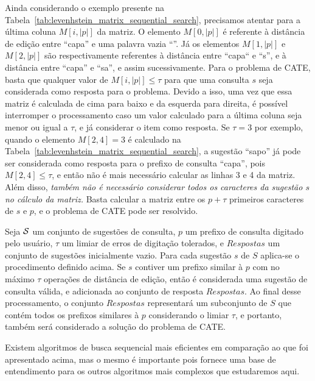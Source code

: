 Ainda considerando o exemplo presente na Tabela~\ref{tab:levenhstein_matrix_sequential_search}, precisamos atentar para a última coluna $M[i, |p|]$ da matriz. O elemento $M[0, |p|]$ é referente à distância de edição entre ``capa'' e uma palavra vazia ``''. Já os elementos $M[1, |p|]$ e $M[2, |p|]$ são respectivamente referentes à distância entre ``capa`` e ``s'', e à distância entre ``capa'' e ``sa'', e assim sucessivamente. Para o problema de CATE, basta que qualquer valor de $M[i, |p|] \leq \tau$ para que uma consulta $s$ seja considerada como resposta para o problema. Devido a isso, uma vez que essa matriz é calculada de cima para baixo e da esquerda para direita, é possível interromper o processamento caso um valor calculado para a última coluna seja menor ou igual a $\tau$, e já considerar o item como resposta. Se $\tau = 3$ por exemplo, quando o elemento $M[2, 4] = 3$ é calculado na Tabela~\ref{tab:levenhstein_matrix_sequential_search}, a sugestão ``sapo'' já pode ser considerada como resposta para o prefixo de consulta ``capa'', pois $M[2, 4] \leq \tau$, e então não é mais necessário calcular as linhas 3 e 4 da matriz. Além disso, \textit{também não é necessário considerar todos os caracteres da sugestão $s$ no cálculo da matriz.} Basta calcular a matriz entre os $p + \tau$ primeiros caracteres de $s$ e $p$, e o problema de CATE pode ser resolvido.

Seja $\mathcal{S}$ um conjunto de sugestões de consulta, $p$ um prefixo de consulta digitado pelo usuário, $\tau$ um limiar de erros de digitação tolerados, e $Respostas$ um conjunto de sugestões inicialmente vazio. Para cada sugestão $s$ de $S$ aplica-se o procedimento definido acima. Se $s$ contiver um prefixo similar à $p$ com no máximo $\tau$ operações de distância de edição, então é considerada uma sugestão de consulta válida, e adicionada ao conjunto de resposta $Respostas$. Ao final desse processamento, o conjunto $Respostas$ representará um subconjunto de $S$ que contém todos os prefixos similares à $p$ considerando o limiar $\tau$, e portanto, também será considerado a solução do problema de CATE.

Existem algoritmos de busca sequencial mais eficientes em comparação ao que foi apresentado acima, mas o mesmo é importante pois fornece uma base de entendimento para os outros algoritmos mais complexos que estudaremos aqui. 

